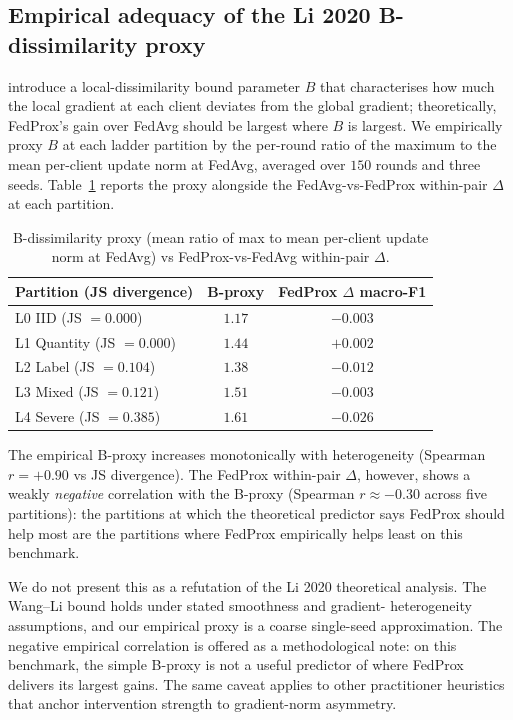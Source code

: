 \documentclass[11pt,a4paper]{report}
\begin{document}
\subsection{Empirical adequacy of the Li 2020 B-dissimilarity proxy}
\label{sec:robustness-b-proxy}

\citet{li2020fedprox} introduce a local-dissimilarity bound parameter
$B$ that characterises how much the local gradient at each client
deviates from the global gradient; theoretically, FedProx's gain over
FedAvg should be largest where $B$ is largest. We empirically
proxy $B$ at each ladder partition by the per-round ratio of the
maximum to the mean per-client update norm at FedAvg, averaged over
$150$ rounds and three seeds. Table~\ref{tab:b-proxy} reports the
proxy alongside the FedAvg-vs-FedProx within-pair $\Delta$ at each
partition.

\begin{table}[!htbp]
\centering
\caption{B-dissimilarity proxy (mean ratio of max to mean per-client
update norm at FedAvg) vs FedProx-vs-FedAvg within-pair $\Delta$.}
\label{tab:b-proxy}
\small
\begin{tabular}{lcc}
\toprule
Partition (JS divergence)   & B-proxy & FedProx $\Delta$ macro-F1 \\
\midrule
L0 IID (JS $= 0.000$)        & $1.17$ & $-0.003$ \\
L1 Quantity (JS $= 0.000$)   & $1.44$ & $+0.002$ \\
L2 Label (JS $= 0.104$)      & $1.38$ & $-0.012$ \\
L3 Mixed (JS $= 0.121$)      & $1.51$ & $-0.003$ \\
L4 Severe (JS $= 0.385$)     & $1.61$ & $-0.026$ \\
\bottomrule
\end{tabular}
\end{table}

The empirical B-proxy increases monotonically with heterogeneity (Spearman
$r = +0.90$ vs JS divergence). The FedProx within-pair $\Delta$, however,
shows a weakly \emph{negative} correlation with the B-proxy (Spearman
$r \approx -0.30$ across five partitions): the partitions at which the
theoretical predictor says FedProx should help most are the partitions
where FedProx empirically helps least on this benchmark.

We do not present this as a refutation of the Li 2020 theoretical
analysis. The Wang--Li bound holds under stated smoothness and gradient-
heterogeneity assumptions, and our empirical proxy is a coarse
single-seed approximation. The negative empirical correlation is offered
as a methodological note: on this benchmark, the simple B-proxy is not a
useful predictor of where FedProx delivers its largest gains. The same
caveat applies to other practitioner heuristics that anchor
intervention strength to gradient-norm asymmetry.
\end{document}
